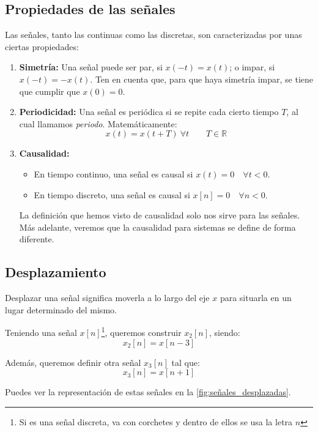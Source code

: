 \documentclass[a4paper]{book}
\begin{document}
\subsection{Propiedades de las señales}
Las señales, tanto las continuas como las discretas, son caracterizadas por unas ciertas propiedades:
\begin{enumerate}
\item \textbf{Simetría:} Una señal puede ser par, si $x(-t) = x(t)$; o impar, si $x(-t) = -x(t)$. Ten en cuenta que, para que haya simetría impar, se tiene que cumplir que $x(0) = 0$.
\item \textbf{Periodicidad:} Una señal es periódica si se repite cada cierto tiempo $T$, al cual llamamos \emph{periodo}. Matemáticamente: \[x(t) = x(t+T) \ \forall t \qquad T \in \mathbb{R}\]
\item \textbf{Causalidad:} \begin{itemize}
\item En tiempo continuo, una señal es causal si $x(t) = 0 \quad \forall t < 0$.
\item En tiempo discreto, una señal es causal si $x[n] = 0 \quad \forall n<0$.
\end{itemize}
\begin{nota}
La definición que hemos visto de causalidad solo nos sirve para las señales. Más adelante, veremos que la causalidad para sistemas se define de forma diferente.
\end{nota}
\end{enumerate}




\subsection{Desplazamiento}
Desplazar una señal significa moverla a lo largo del eje $x$ para situarla en un lugar determinado del mismo.

\begin{ejemplo}
	Teniendo una señal $x[n]$\footnote{Si es una señal discreta, va con corchetes y dentro de ellos se usa la letra $n$}, queremos construir $x_2[n]$, siendo: \[x_2[n] = x[n-3]\]
\end{ejemplo}

\begin{ejemplo}
	Además, queremos definir otra señal $x_3[n]$ tal que: \[x_3[n] = x[n+1]\]
\end{ejemplo}

Puedes ver la representación de estas señales en la \autoref{fig:señales_desplazadas}.
\end{document}
